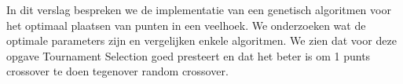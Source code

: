 In dit verslag bespreken we de implementatie van een genetisch algoritmen voor het optimaal plaatsen van punten in een veelhoek. We onderzoeken wat de optimale parameters zijn en vergelijken enkele algoritmen. We zien dat voor deze opgave Tournament Selection goed presteert en dat het beter is om 1 punts crossover te doen tegenover random crossover.